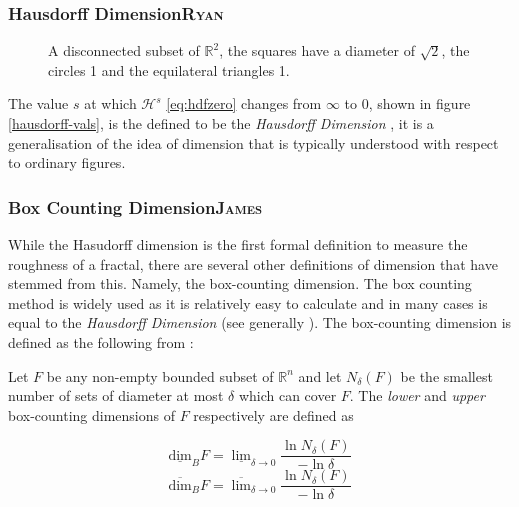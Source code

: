 \documentclass[a4paper,11pt,twoside]{article}
\begin{document}
\subsubsection{Hausdorff Dimension\hfill{}\textsc{Ryan}}
\label{sec:orge5878d8}

\begin{figure}
\centering

\caption{\label{abstract-shape}A disconnected subset of \(\mathbb{R}^{2}\), the squares have a diameter of \(\sqrt{2}\), the circles 1 and the equilateral triangles 1.}
\end{figure}


The value \(s\) at which \(\mathcal{H}^{s}\) \eqref{eq:hdfzero} changes from \(\infty\) to 0, shown in figure \ref{hausdorff-vals},  is the defined to be the \emph{Hausdorff Dimension} \cite[\S 2.2]{falconerFractalGeometryMathematical2003b}, it is a generalisation of the idea of dimension that is typically understood with respect to ordinary figures.

\subsubsection{Box Counting Dimension\hfill{}\textsc{James}}
\label{box-count-dim}
While the Hasudorff dimension is the first formal definition to measure
the roughness of a fractal, there are several other definitions of dimension
that have stemmed from this. Namely, the box-counting dimension. The box
counting method is widely used as it is relatively easy to calculate \cite[p. 41]{falconerFractalGeometryMathematical2003b}
and in many cases is equal to the \emph{Hausdorff Dimension}  \cite[p. 11]{markpollicottFractalsDimensionTheory2005} (see generally \cite{ListFractalsHausdorff2020}).
The box-counting dimension is defined as the following from
\cite{falconerFractalGeometryMathematical2003}:

Let \(F\) be any non-empty bounded subset of \(\mathbb{R}^n\) and let \(N_\delta(F)\) be the smallest
number of sets of diameter at most \(\delta\) which can cover \(F\). The \emph{lower} and \emph{upper}
box-counting dimensions of \(F\) respectively are defined as

\begin{equation*}
    \underline{\text{dim}}_BF = \underline{\lim}_{\delta \to 0} \frac{\ln N_\delta(F)}{-\ln \delta}
\end{equation*}
\begin{equation*}
\overline{\text{dim}}_BF = \overline{\lim}_{\delta \to 0} \frac{\ln N_\delta(F)}{-\ln \delta}
\end{equation*}
\end{document}
